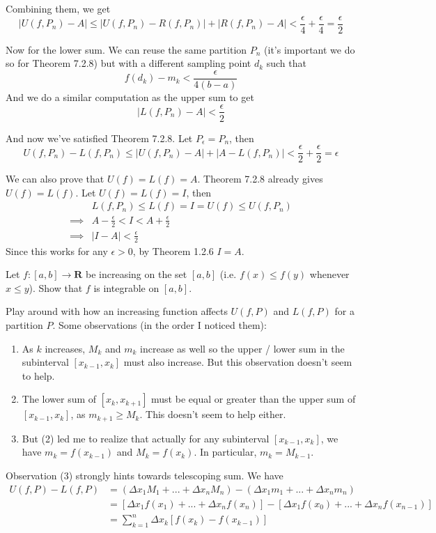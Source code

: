 \documentclass{oxmathproblems}
\begin{document}
\begin{questions}
\begin{solution}
  Combining them, we get
  \[|U(f, P_{n}) - A| \leq |U(f, P_{n}) - R(f, P_{n})| + |R(f, P_{n}) - A| < \frac{\epsilon}{4} + \frac{\epsilon}{4} = \frac{\epsilon}{2}\]

  Now for the lower sum. We can reuse the same partition $P_{n}$ (it's important we do so for Theorem 7.2.8) but with a different sampling point $d_{k}$ such that
  \[f(d_{k}) - m_{k} < \frac{\epsilon}{4(b-a)}\]
  And we do a similar computation as the upper sum to get
  \[|L(f, P_{n})-A| < \frac{\epsilon}{2}\]

  And now we've satisfied Theorem 7.2.8. Let $P_{\epsilon} = P_{n}$, then
  \[U(f, P_{n})-L(f, P_{n}) \leq |U(f, P_{n})-A| + |A - L(f, P_{n})| < \frac{\epsilon}{2} + \frac{\epsilon}{2} = \epsilon\]

  We can also prove that $U(f)=L(f)=A$. Theorem 7.2.8 already gives $U(f)=L(f)$. Let $U(f)=L(f)=I$, then
  \begin{align*}
    &L(f, P_{n}) \leq L(f) = I = U(f)  \leq U(f, P_{n})\\
    \implies &A - \frac{\epsilon}{2} < I < A + \frac{\epsilon}{2}\\
    \implies &|I-A| < \frac{\epsilon}{2}
  \end{align*}
  Since this works for any $\epsilon > 0$, by Theorem 1.2.6 $I=A$.
\end{solution}

\miquestion Let $f: [a, b] \to \textbf{R}$ be increasing on the set $[a, b]$ (i.e. $f(x) \leq f(y)$ whenever $x \leq y$). Show that $f$ is integrable on $[a, b]$.
\begin{solution}
  Play around with how an increasing function affects $U(f, P)$ and $L(f, P)$ for a partition $P$. Some observations (in the order I noticed them):
  \begin{enumerate}
    \item As $k$ increases, $M_{k}$ and $m_{k}$ increase as well so the upper / lower sum in the subinterval $[x_{k-1}, x_{k}]$ must also increase. But this observation doesn't seem to help.
    \item The lower sum of $[x_{k}, x_{k+1}]$ must be equal or greater than the upper sum of $[x_{k-1}, x_{k}]$, as $m_{k+1} \geq M_{k}$. This doesn't seem to help either.
    \item But (2) led me to realize that actually for any subinterval $[x_{k-1}, x_{k}]$, we have $m_{k}=f(x_{k-1})$ and $M_{k}=f(x_{k})$. In particular, $m_{k}=M_{k-1}$.
  \end{enumerate}
  Observation (3) strongly hints towards telescoping sum. We have
  \begin{align*}
      U(f, P) - L(f, P) &= (\Delta{x_{1}}M_{1} + ... + \Delta{x_{n}}M_{n}) - (\Delta{x_{1}}m_{1} + ... + \Delta{x_{n}}m_{n})\\
      &= [\Delta{x_{1}}f(x_{1}) + ... + \Delta{x_{n}}f(x_{n})] - [\Delta{x_{1}}f(x_{0}) + ... + \Delta{x_{n}}f(x_{n-1})]\\
      &= \sum_{k=1}^{n}\Delta{x_{k}}[f(x_{k})-f(x_{k-1})]
  \end{align*}


\end{solution}
\end{questions}
\end{document}
